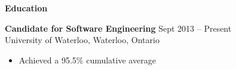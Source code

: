 \documentclass{letter}
\begin{document}
{\bfseries \Large Education}

\vspace{-1.5mm}
{\bfseries Candidate for Software Engineering} \hfill Sept 2013 -- Present \\
University of Waterloo, Waterloo, Ontario
\vspace{-3mm}
\begin{itemize}
    \item Achieved a 95.5\% cumulative average
\end{itemize}
\end{document}

